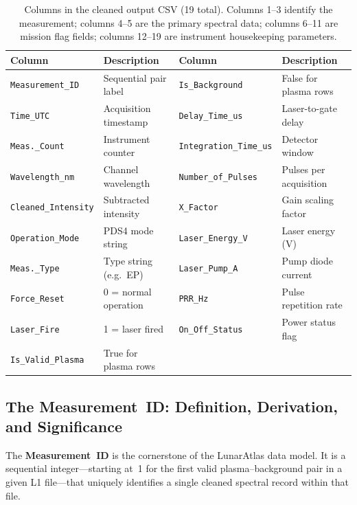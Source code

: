 \documentclass[a4paper,twocolumn,10pt]{article}
\begin{document}
\begin{table}[!t]
\centering
\caption{Columns in the cleaned output CSV (19 total).  Columns 1--3
  identify the measurement; columns 4--5 are the primary spectral data;
  columns 6--11 are mission flag fields; columns 12--19 are instrument
  housekeeping parameters.}
\label{tab:cleaned_schema}
{\small
\begin{tabularx}{\textwidth}{@{}lXlX@{}}
\toprule
\textbf{Column} & \textbf{Description} &
  \textbf{Column} & \textbf{Description} \\
\midrule
\texttt{Measurement\_ID} & Sequential pair label &
  \texttt{Is\_Background} & False for plasma rows \\
\texttt{Time\_UTC} & Acquisition timestamp &
  \texttt{Delay\_Time\_us} & Laser-to-gate delay \\
\texttt{Meas.\_Count} & Instrument counter &
  \texttt{Integration\_Time\_us} & Detector window \\
\texttt{Wavelength\_nm} & Channel wavelength &
  \texttt{Number\_of\_Pulses} & Pulses per acquisition \\
\texttt{Cleaned\_Intensity} & Subtracted intensity &
  \texttt{X\_Factor} & Gain scaling factor \\
\texttt{Operation\_Mode} & PDS4 mode string &
  \texttt{Laser\_Energy\_V} & Laser energy (V) \\
\texttt{Meas.\_Type} & Type string (e.g.\ EP) &
  \texttt{Laser\_Pump\_A} & Pump diode current \\
\texttt{Force\_Reset} & 0 = normal operation &
  \texttt{PRR\_Hz} & Pulse repetition rate \\
\texttt{Laser\_Fire} & 1 = laser fired &
  \texttt{On\_Off\_Status} & Power status flag \\
\texttt{Is\_Valid\_Plasma} & True for plasma rows &
  & \\
\bottomrule
\end{tabularx}
}
\end{table}

\subsection{The Measurement~ID: Definition, Derivation, and Significance}
\label{subsec:measurement_id}

The \textbf{Measurement~ID} is the cornerstone of the LunarAtlas data
model.  It is a sequential integer---starting at~1 for the first valid
plasma--background pair in a given L1 file---that uniquely identifies
a single cleaned spectral record within that file.
\end{document}
